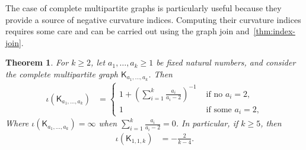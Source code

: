 \documentclass[11pt,a4paper]{article}
\newcommand{\Complete}{\mathsf{K}}
\newtheorem{theorem}{Theorem}[section]
\begin{document}
    The case of complete multipartite graphs is particularly useful because they provide a source of negative curvature indices. Computing their curvature indices requires some care and can be carried out using the graph join and~\cref{thm:index-join}.
    
    \begin{theorem}\label{thm:kmn}
        For $k \geq 2$, let $a_1,\dotsc, a_k\ge 1$ be fixed natural numbers, and consider the complete multipartite graph $\Complete_{a_1,\dotsc, a_k}$. Then
            \begin{align}\label{eq:kmn-1}
                \iota(\Complete_{a_1,\dotsc, a_k}) &= \begin{cases}
                   1 + \left(\sum_{i=1}^{k} \frac{a_i}{a_i-2}\right)^{-1} & \text{ if no }a_i = 2,\\
                   1 & \text{ if some }a_i = 2,
                \end{cases}
            \end{align}
        Where $\iota(\Complete_{a_1,\ldots, a_k}) = \infty$ when $\sum_{i=1}^k \frac{a_i}{a_i - 2} = 0$.
        In particular, if $k\geq 5$, then
            \begin{align*}
                \iota(\Complete_{1, 1, k}) &= -\frac{2}{k-4}.
            \end{align*}
    \end{theorem}
\end{document}
